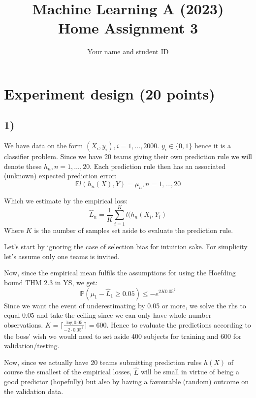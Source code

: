 \documentclass[a4paper,12pt]{article}
\begin{document}
\title{Machine Learning A (2023)\\Home Assignment 3}
\author{\color{red}Your name and student ID}
\date{}
\maketitle

\tableofcontents %
\newpage %

\section{Experiment design (20 points)}
\subsection*{1)}
We have data on the form $(X_i, y_i), i = 1,\dots,2000$. $y_i \in \{0,1\}$ hence it is a classifier problem. Since we have 20 teams giving their own prediction rule we will denote these $h_n, n = 1,\dots,20$.
Each prediction rule then has an associated (unknown) expected prediction error:
$$
\mathbb{E}l(h_n(X), Y) = \mu_n, n = 1,\dots,20
$$

Which we estimate by the empirical loss:
$$
\hat{L}_n = \frac{1}{K}\sum_{i = 1}^Kl(h_n(X_i, Y_i) 
$$
Where $K$ is the number of samples set aside to evaluate the prediction rule.


Let's start by ignoring the case of selection bias for intuition sake. For simplicity let's assume only one teams is invited.

Now, since the empirical mean fulfils the assumptions for using the Hoefding bound THM 2.3 in YS, we get:
$$
\mathbb{P}(\mu_1 - \hat{L}_1 \geq 0.05) \leq -e^{2K0.05^2} 
$$
Since we want the event of underestimating by 0.05 or more, we solve the rhs to equal 0.05 and take the ceiling since we can only have whole number observations. $K =\lceil \frac{\log0.05}{-2\cdot 0.05^2} \rceil= 600$. Hence to evaluate the predictions according to the boss' wish we would need to set aside 400 subjects for training and 600 for validation/testing.

Now, since we actually have 20 teams submitting prediction rules $h(X)$ of course the smallest of the empirical losses, $\hat{L}$ will be small in virtue of being a good predictor (hopefully) but also by having a favourable (random) outcome on the validation data. 
\end{document}
